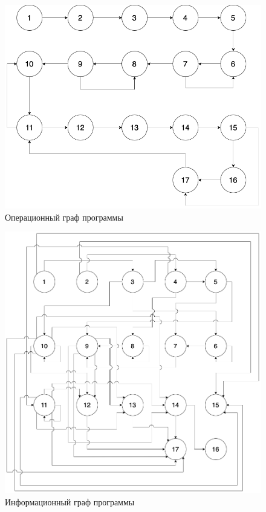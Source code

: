 \documentclass[a4paper,14pt, unknownkeysallowed]{extreport}
\begin{document}
\begin{figure}[h]
	\centering
	\includegraphics[scale=0.6]{img/oper_graph.png}
	\caption{Операционный граф программы}
	\label{fig:oper_graph}
\end{figure}

\clearpage

\begin{figure}[h]
	\centering
	\includegraphics[scale=0.5]{img/inf_graph.png}
	\caption{Информационный граф программы}
	\label{fig:inf_graph}
\end{figure}
\end{document}
